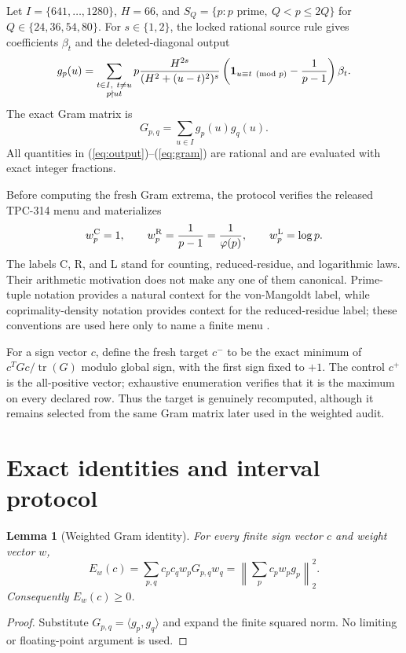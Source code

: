 \documentclass[10pt,a4paper]{article}
\newtheorem{lemma}{Lemma}
\begin{document}
Let $I=\{641,\ldots,1280\}$, $H=66$, and
$S_Q=\{p: p\text{ prime},\ Q<p\leq 2Q\}$ for
$Q\in\{24,36,54,80\}$.  For $s\in\{1,2\}$, the locked rational source rule
gives coefficients $\beta_t$ and the deleted-diagonal output
\begin{equation}
 g_p(u)=\sum_{\substack{t\in I,\ t\ne u\\p\nmid ut}}
 p\frac{H^{2s}}{(H^2+(u-t)^2)^s}
 \left({\bf1}_{u\equiv t\pmod p}-\frac1{p-1}\right)\beta_t .
 \label{eq:output}
\end{equation}
The exact Gram matrix is
\begin{equation}
 G_{p,q}=\sum_{u\in I}g_p(u)g_q(u).
 \label{eq:gram}
\end{equation}
All quantities in (\ref{eq:output})--(\ref{eq:gram}) are rational and are
evaluated with exact integer fractions.

Before computing the fresh Gram extrema, the protocol verifies the released
TPC-314 menu and materializes
\begin{equation}
 w_p^{\rm C}=1,\qquad
 w_p^{\rm R}=\frac1{p-1}=\frac1{\varphi(p)},\qquad
 w_p^{\rm L}=\log p .
 \label{eq:laws}
\end{equation}
The labels C, R, and L stand for counting, reduced-residue, and logarithmic
laws.  Their arithmetic motivation does not make any one of them canonical.
Prime-tuple notation provides a natural context for the von-Mangoldt label,
while coprimality-density notation provides context for the reduced-residue
label; these conventions are used here only to name a finite menu
\cite{cantarini2018,revesz2021,banksfordtao2023}.

For a sign vector $c$, define the fresh target $c^-$ to be the exact minimum
of $c^T Gc/\operatorname{tr}(G)$ modulo global sign, with the first sign
fixed to $+1$.  The control $c^+$ is the all-positive vector; exhaustive
enumeration verifies that it is the maximum on every declared row.  Thus the
target is genuinely recomputed, although it remains selected from the same
Gram matrix later used in the weighted audit.

\section{Exact identities and interval protocol}

\begin{lemma}[Weighted Gram identity]
For every finite sign vector $c$ and weight vector $w$,
\begin{equation}
 E_w(c)=\sum_{p,q}c_pc_qw_pG_{p,q}w_q
       =\left\|\sum_p c_pw_pg_p\right\|_2^2 .
 \label{eq:weighted}
\end{equation}
Consequently $E_w(c)\geq0$.
\end{lemma}
\begin{proof}
Substitute $G_{p,q}=\langle g_p,g_q\rangle$ and expand the finite squared
norm.  No limiting or floating-point argument is used.
\end{proof}
\end{document}
